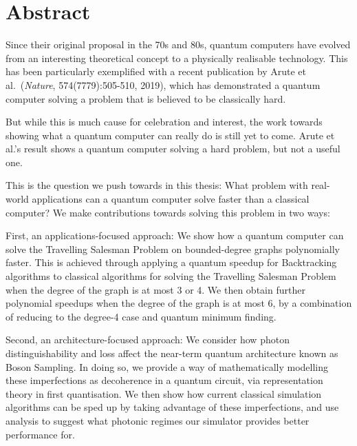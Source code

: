 \chapter*{Abstract}

Since their original proposal in the 70s and 80s, quantum computers have evolved from an interesting theoretical concept to a physically realisable technology. This has been particularly exemplified with a recent publication by Arute et al.~(\emph{Nature}, 574(7779):505-510, 2019), which has demonstrated a quantum computer solving a problem that is believed to be classically hard.

But while this is much cause for celebration and interest, the work towards showing what a quantum computer can really do is still yet to come. Arute et al.'s result shows a quantum computer solving a hard problem, but not a useful one.

This is the question we push towards in this thesis: What problem with real-world applications can a quantum computer solve faster than a classical computer? We make contributions towards solving this problem in two ways:

First, an applications-focused approach: We show how a quantum computer can solve the Travelling Salesman Problem on bounded-degree graphs polynomially faster. This is achieved through applying a quantum speedup for Backtracking algorithms to classical algorithms for solving the Travelling Salesman Problem when the degree of the graph is at most 3 or 4. We then obtain further polynomial speedups when the degree of the graph is at most 6, by a combination of reducing to the degree-4 case and quantum minimum finding.

Second, an architecture-focused approach: We consider how photon distinguishability and loss affect the near-term quantum architecture known as Boson Sampling. In doing so, we provide a way of mathematically modelling these imperfections as decoherence in a quantum circuit, via representation theory in first quantisation. We then show how current classical simulation algorithms can be sped up by taking advantage of these imperfections, and use analysis to suggest what photonic regimes our simulator provides better performance for.
